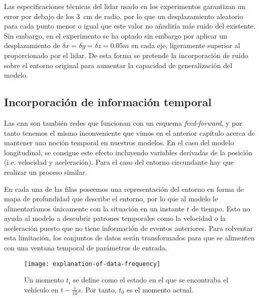 Las especificaciones técnicas del \ac{lidar} usado en los experimentos garantizan un error por debajo de los \SI{3}{\cm} de radio, por lo que un desplazamiento aleatorio para cada punto menor o igual que este valor no añadiría más ruido del existente. Sin embargo, en el experimento se ha optado sin embargo por aplicar un desplazamiento de $\delta x = \delta y = \delta z = 0.05m$ en cada eje, ligeramente superior al proporcionado por el lidar. De esta forma se pretende la incorporación de ruido sobre el entorno original para aumentar la capacidad de generalización del modelo.

\subsection{Incorporación de información temporal}

Las \ac{cnn} son también redes que funcionan con un esquema \textit{feed-forward}, y por tanto tenemos el mismo inconveniente que vimos en el anterior capítulo acerca de mantener una noción temporal en nuestros modelos. En el caso del modelo longitudinal, se consigue este efecto incluyendo variables derivadas de la posición (i.e. velocidad y aceleración). Para el caso del entorno circundante hay que realizar un proceso similar.

En cada una de las filas poseemos una representación del entorno en forma de mapa de profundidad que describe el entorno, por lo que al modelo le alimentaríamos únicamente con la situación en un instante $t$ de tiempo. Esto no ayuda al modelo a descubrir patrones temporales como la velocidad o la aceleración puesto que no tiene información de eventos anteriores. Para solventar esta limitación, los conjuntos de datos serán transformados para que se alimenten con una ventana temporal de parámetros de entrada.

\begin{figure}[t]
	\centering
	\texttt{[image: explanation-of-data-frequency]}
	\caption[Momento $t_i$en el conjunto de datos]{Un momento $t_i$ se define como el estado en el que se encontraba el vehículo en $t - \frac{i}{10}s$. Por tanto, $t_0$ es el momento actual.}
	\label{fig:moments-illustration}
\end{figure}

